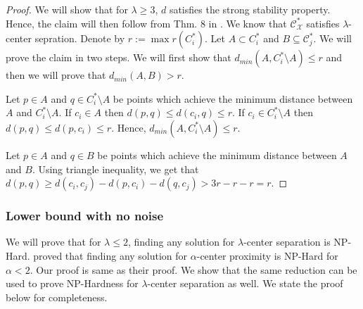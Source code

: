 \documentclass[anon,12pt]{colt2016} %
\newcommand{\mc}{\mathcal}
\begin{document}
\begin{proof}
We will show that for $\lambda \ge 3$, $d$ satisfies the strong stability property. Hence, the claim will then follow from Thm. 8 in \cite{balcan2008discriminative}. We know that $\mc C_{\mc X}^*$ satisfies $\lambda$-center sepration. Denote by $r := \max r(C_i^*)$. Let $A \subset C_i^*$ and $B \subseteq \mc C_j^*$. We will prove the claim in two steps. We will first show that $d_{min}(A, C_i^*\setminus A) \le r$ and then we will prove that $d_{min}(A, B) > r$.

Let $p \in A$ and $q \in C_i^* \setminus A$ be points which achieve the minimum distance between $A$ and $C_i^*\setminus A$. If $c_i \in A$ then $d(p, q) \le d(c_i, q) \le r$. If $c_i \in C_i^* \setminus A$ then $d(p, q) \le d(p, c_i) \le r$. Hence, $d_{min} (A, C_i^*\setminus A) \le r$.

Let $p \in A$ and $q \in B$ be points which achieve the minimum distance between $A$ and $B$. Using triangle inequality, we get that $d(p, q) \ge d(c_i, c_j) - d(p, c_i) - d(q, c_j) > 3r - r - r = r$.
\end{proof}

\subsubsection{Lower bound with no noise}
We will prove that for $\lambda \le 2$, finding any solution for $\lambda$-center separation is NP-Hard. \cite{reyzin2012data} proved that finding any solution for $\alpha$-center proximity is NP-Hard for $\alpha < 2$. Our proof is same as their proof. We show that the same reduction can be used to prove NP-Hardness for $\lambda$-center separation as well. We state the proof below for completeness.
\end{document}
